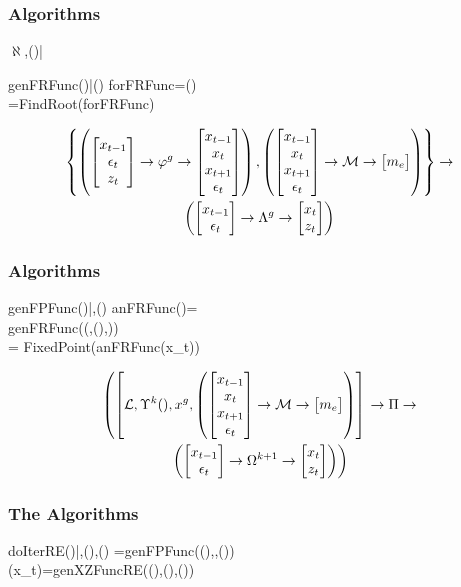 \documentclass[letter]{beamer}
\begin{document}
\begin{frame}
  \frametitle{Algorithms}
  

\begin{pseudocode}{$\aleph$}{\xtGuess,()|\linMod}
\RETURN{\xzFunc\tArgZ}  
\end{pseudocode}

\label{genFRFuncDef}



\begin{pseudocode}{genFRFunc}{\xzFunc()|\modEqns()}
forFRFunc\tArgZ=\modEqns(\xzFunc\tArgZ)\\
\frFunc\tArg=FindRoot(forFRFunc\tArgZ)\\
\RETURN{\frFunc\tArg}  
\end{pseudocode}
\begin{gather}
\left \{
\left (  \begin{bmatrix} x_{t-1}\\ \epsilon_t\\z_t \end{bmatrix} \rightarrow {\varphi^g} \rightarrow \begin{bmatrix} x_{t-1}\\ x_t\\x_{t+1}\\ \epsilon_t \end{bmatrix} \right )
,
\left (  \begin{bmatrix} x_{t-1}\\x_{t}\\x_{t+1}\\ \epsilon_t \end{bmatrix} \rightarrow \mathcal{M} \rightarrow  \begin{bmatrix} m_e \end{bmatrix} \right )
 \right \}
 \rightarrow\\
\left (  \begin{bmatrix} x_{t-1}\\ \epsilon_t \end{bmatrix}  \rightarrow  {\Lambda^g} \rightarrow  \begin{bmatrix} x_t\\z_t \end{bmatrix}  \right )
\end{gather}


\end{frame}


 \begin{frame}
   \frametitle{Algorithms}
   
\label{genFPFuncDef}

 \begin{pseudocode}{genFPFunc}{()|\linMod,\modEqns()}
 anFRFunc(\xtGuess)=\\genFRFunc(\aleph(\linMod,(),\xtGuess))\\
\tArg=
 FixedPoint(anFRFunc(x_t))\\
\end{pseudocode}
{\small
\begin{gather}
  \label{eq:2}
\fMap{\Pi}
{\left [\linMod, \XZExp{k}(),x^g,
\modEqnsMap
\right ] \right .}{\\ \left .
\fpFuncMap
}
\end{gather}
}

\end{frame}



\begin{frame}
  \frametitle{The Algorithms}

\label{doIterREDef}

 \begin{pseudocode}{doIterRE}{()|\linMod,\modEqns(),\epsDist()}
 \tArg=genFPFunc((),\linMod,\modEqns())\\
 (x_t)=genXZFuncRE((),(),\epsDist())\\
 \end{pseudocode}
 \end{frame}


 
 
\end{document}
